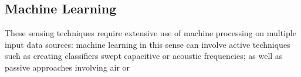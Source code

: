 \subsection{Machine Learning}

These sensing techniques require extensive use of machine processing on multiple input data sources: machine learning in this sense can involve active techniques such as creating classifiers swept capacitive \cite{sato-touche} or acoustic \cite{ono-touchandactivate,laput-acoustruments} frequencies; as well as passive approaches involving air \cite{slyper-softrobots} or 
